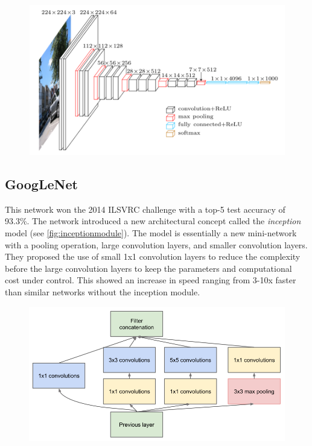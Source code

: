 \begin{figure}[H]
    \centering
    \includegraphics[width=0.7\linewidth]{fig/vgg16.png}
    \label{fig:vgg}
\end{figure}


\subsection{GoogLeNet}
This network won the 2014 ILSVRC challenge with a top-5 test accuracy of 93.3\%. The network introduced a new architectural concept called the \emph{inception} model (see \autoref{fig:inceptionmodule}). The model is essentially a new mini-network with a pooling operation, large convolution layers, and smaller convolution layers. They proposed the use of small 1x1 convolution layers to reduce the complexity before the large convolution layers to keep the parameters and computational cost under control. This showed an increase in speed ranging from 3-10x faster than similar networks without the inception module.

\begin{figure}[H]
    \centering
    \includegraphics[width=0.7\linewidth]{fig/googlenet.png}
    \label{fig:inceptionmodule}
\end{figure}


